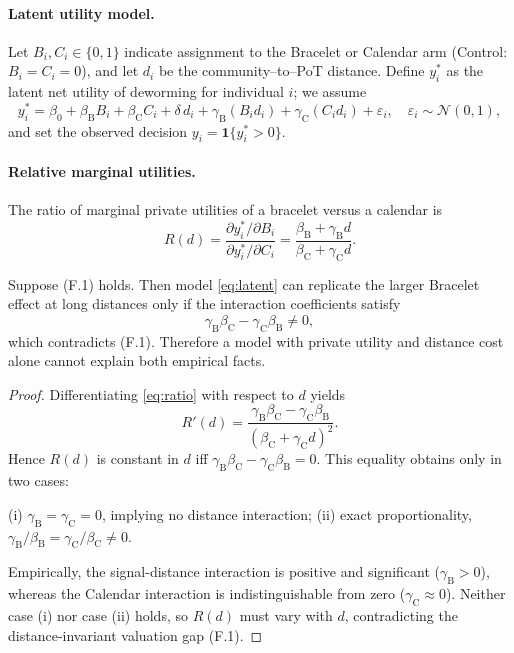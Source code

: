\documentclass[12pt,a4paper]{article}
\begin{document}
\paragraph{Latent utility model.}
Let \(B_i,C_i\in\{0,1\}\) indicate assignment to the Bracelet or Calendar arm (Control: \(B_i=C_i=0\)), and let \(d_i\) be the community–to–PoT distance. Define \(y_i^{*}\) as the latent net utility of deworming for individual \(i\); we assume
\begin{equation}
  y_i^{*}= \beta_0
           +\beta_{\mathrm B} B_i
           +\beta_{\mathrm C} C_i
           +\delta\,d_i
           +\gamma_{\mathrm B}(B_i d_i)
           +\gamma_{\mathrm C}(C_i d_i)
           +\varepsilon_i,\quad
           \varepsilon_i\sim\mathcal N(0,1),
  \label{eq:latent}
\end{equation}
and set the observed decision \(y_i=\mathbf 1\{y_i^{*}>0\}\).

\paragraph{Relative marginal utilities.}
The ratio of marginal private utilities of a bracelet versus a calendar is
\begin{equation}
  R(d)=
  \frac{\partial y_i^{*}/\partial B_i}{\partial y_i^{*}/\partial C_i}
  =
  \frac{\beta_{\mathrm B}+\gamma_{\mathrm B} d}
       {\beta_{\mathrm C}+\gamma_{\mathrm C} d}.
  \label{eq:ratio}
\end{equation}

\begin{proposition}\label{prop:mrs}
  Suppose (F.1) holds.  
  Then model \eqref{eq:latent} can replicate the larger Bracelet effect at long distances only if the interaction coefficients satisfy
  \[
     \gamma_{\mathrm B}\beta_{\mathrm C}-\gamma_{\mathrm C}\beta_{\mathrm B}\neq 0,
  \tag{F.2}
  \]
  which contradicts (F.1). Therefore a model with private utility and distance cost alone cannot explain both empirical facts.
\end{proposition}

\begin{proof}
Differentiating \eqref{eq:ratio} with respect to \(d\) yields
\[
  R'(d)
  =\frac{\gamma_{\mathrm B}\beta_{\mathrm C}-\gamma_{\mathrm C}\beta_{\mathrm B}}
        {(\beta_{\mathrm C}+\gamma_{\mathrm C}d)^{2}}.
\]
Hence \(R(d)\) is constant in \(d\) iff \(\gamma_{\mathrm B}\beta_{\mathrm C}-\gamma_{\mathrm C}\beta_{\mathrm B}=0\).  
This equality obtains only in two cases:

\smallskip
\noindent
(i) \(\gamma_{\mathrm B}=\gamma_{\mathrm C}=0\), implying no distance interaction;  
(ii) exact proportionality, \(\gamma_{\mathrm B}/\beta_{\mathrm B}=\gamma_{\mathrm C}/\beta_{\mathrm C}\neq 0\).

\smallskip
Empirically, the signal-distance interaction is positive and significant (\(\gamma_{\mathrm B}>0\)), whereas the Calendar interaction is indistinguishable from zero (\(\gamma_{\mathrm C}\approx 0\)).  Neither case (i) nor case (ii) holds, so \(R(d)\) must vary with \(d\), contradicting the distance‑invariant valuation gap (F.1).
\end{proof}
\end{document}
